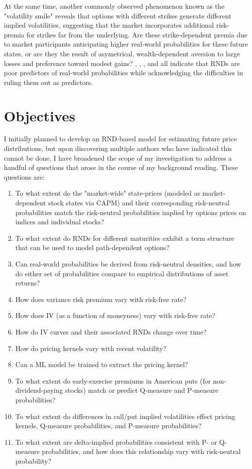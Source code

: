 \documentclass[final,3p,times,authoryear]{elsarticle}
\begin{document}
  At the same time, another commonly observed phenomenon known as the "volatility smile" reveals that options with different strikes generate different implied volatilities, suggesting that the market incorporates additional risk-premia for strikes far from the underlying. Are these strike-dependent premia due to market participants anticipating higher real-world probabilities for these future states, or are they the result of asymetrical, wealth-dependent aversion to large losses and preference toward modest gains? \citet{jackwerth_option-implied_2004}, \citet{figlewski_risk-netrual_2018}, \citet{shiratsuka_information_2001}, and \citet{anagnou_relation_2002} all indicate that RNDs are poor predictors of real-world probabilities while acknowledging the difficulties in ruling them out as predictors. 


\section{Objectives}
  \label{objectives}
  I initially planned to develop an RND-based model for estimating future price distributions, but upon discovering multiple authors who have indicated this cannot be done, I have broadened the scope of my investigation to address a handful of questions that arose in the course of my background reading. These questions are:
  \begin{enumerate}
    \item To what extent do the "market-wide" state-prices (modeled as market-dependent stock states via CAPM) and their corresponding risk-neutral probabilities match the risk-neutral probabilities implied by options prices on indices and individual stocks?
    \item To what extent do RNDs for different maturities exhibit a term structure that can be used to model path-dependent options?
    \item Can real-world probabilities be derived from risk-neutral densities, and how do either set of probabilities compare to empirical distributions of asset returns?
    \item How does variance risk premium vary with risk-free rate?
    \item How does IV (as a function of moneyness) vary with risk-free rate?
    \item How do IV curves and their associated RNDs change over time?
    \item How do pricing kernels vary with recent volatility?
    \item Can a ML model be trained to extract the pricing kernel?
    \item To what extent do early-exercise premiums in American puts (for non-dividend-paying stocks) match or predict Q-measure and P-measure probabilities?
    \item To what extent do differences in call/put implied volatilities effect pricing kernels, Q-measure probabilities, and P-measure probabilities?
    \item To what extent are delta-implied probabilities consistent with P- or Q- measure probabilities, and how does this relationship vary with risk-neutral probability?
  \end{enumerate}
\end{document}
